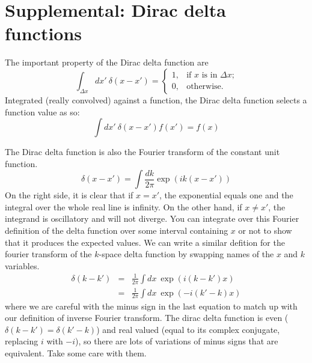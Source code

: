 \section*{Supplemental: Dirac delta functions}
The important property of the Dirac delta function are
\begin{equation}
  \int_{\Delta x} dx'\ \delta(x-x') = \left\{
  \begin{array}{ll} 1, & \mbox{if $x$ is in $\Delta x$;} \\ 0, & \mbox{otherwise.} \end{array}
  \right.
\end{equation}
Integrated (really convolved) against a function, the Dirac delta function selects a function value as so:
\begin{equation}
  \int dx'\ \delta(x-x') f(x') = f(x)
\end{equation}

The Dirac delta function is also the Fourier transform of the constant unit function.
\begin{equation}
   \delta(x-x') = \int \frac{dk}{2\pi} \exp(i k (x-x')) 
\end{equation}
On the right side, it is clear that if $x=x'$, the exponential equals one and the integral over the whole real line is infinity.  On the other hand, if $x \neq x'$, the integrand is oscillatory and will not diverge.  You can integrate over this Fourier definition of the delta function over some interval containing $x$ or not to show that it produces the expected values.  We can write a similar defition for the fourier transform of the $k$-space delta function by swapping names of the $x$ and $k$ variables.
\begin{eqnarray}
  \delta(k - k') &=& \frac{1}{2\pi}  \int {dx}\ \exp(i (k-k')x)    \\
  &=& \frac{1}{2\pi}  \int {dx}\ \exp(-i (k'-k)x) 
\end{eqnarray}
where we are careful with the minus sign in the last equation to match up with our definition of inverse Fourier transform.  The dirac delta function is even ($\delta(k-k') = \delta(k' - k)$) and real valued (equal to its complex conjugate, replacing $i$ with $-i$), so there are lots of variations of minus signs that are equivalent.  Take some care with them.
